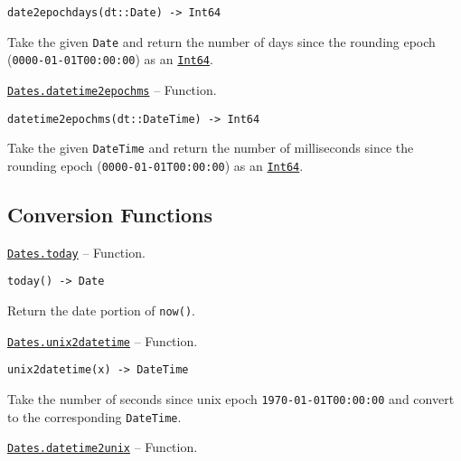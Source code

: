 \begin{adjustwidth}{2em}{0pt}


\begin{verbatim}
date2epochdays(dt::Date) -> Int64
\end{verbatim}

Take the given \texttt{Date} and return the number of days since the rounding epoch (\texttt{0000-01-01T00:00:00}) as an \hyperlink{7720564657383125058}{\texttt{Int64}}.



\end{adjustwidth}
\hypertarget{12248243003394996071}{} 
\hyperlink{12248243003394996071}{\texttt{Dates.datetime2epochms}}  -- {Function.}

\begin{adjustwidth}{2em}{0pt}


\begin{verbatim}
datetime2epochms(dt::DateTime) -> Int64
\end{verbatim}

Take the given \texttt{DateTime} and return the number of milliseconds since the rounding epoch (\texttt{0000-01-01T00:00:00}) as an \hyperlink{7720564657383125058}{\texttt{Int64}}.



\end{adjustwidth}

\hypertarget{16263610530566732944}{}


\subsection{Conversion Functions}


\hypertarget{14772120662961874184}{} 
\hyperlink{14772120662961874184}{\texttt{Dates.today}}  -- {Function.}

\begin{adjustwidth}{2em}{0pt}


\begin{verbatim}
today() -> Date
\end{verbatim}

Return the date portion of \texttt{now()}.



\end{adjustwidth}
\hypertarget{1873675393210620747}{} 
\hyperlink{1873675393210620747}{\texttt{Dates.unix2datetime}}  -- {Function.}

\begin{adjustwidth}{2em}{0pt}


\begin{verbatim}
unix2datetime(x) -> DateTime
\end{verbatim}

Take the number of seconds since unix epoch \texttt{1970-01-01T00:00:00} and convert to the corresponding \texttt{DateTime}.



\end{adjustwidth}
\hypertarget{4964397354460606136}{} 
\hyperlink{4964397354460606136}{\texttt{Dates.datetime2unix}}  -- {Function.}

